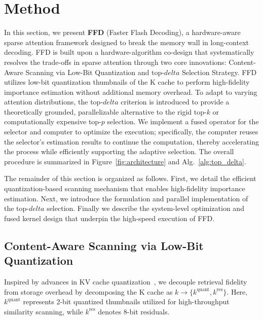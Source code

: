 \documentclass[]{mosi}
\def\bm#1{#1}%
\def\delta{delta}%
\theoremstyle{plain}
\theoremstyle{definition}
\theoremstyle{remark}
\begin{document}
\section{Method}
\label{sec:method}





In this section, we present \textbf{FFD} (Faster Flash Decoding), a hardware-aware sparse attention framework designed to break the memory wall in long-context decoding. FFD is built upon a hardware-algorithm co-design that systematically resolves the trade-offs in sparse attention through two core innovations: Content-Aware Scanning via Low-Bit Quantization and top-$\bm\delta$ Selection Strategy. FFD utilizes low-bit quantization thumbnails of the K cache to perform high-fidelity importance estimation without additional memory overhead. To adapt to varying attention distributions, the top-$\delta$ criterion is introduced to provide a theoretically grounded, parallelizable alternative to the rigid top-$k$ or computationally expensive top-$p$ selection. We implement a fused operator for the selector and computer to optimize the execution; specifically, the computer reuses the selector's estimation results to continue the computation, thereby accelerating the process while efficiently supporting the adaptive selection. The overall procedure is summarized in Figure~\ref{fig:architecture} and Alg.~\ref{alg:top_delta}.

The remainder of this section is organized as follows. First, we detail the efficient quantization-based scanning mechanism that enables high-fidelity importance estimation. Next, we introduce the formulation and parallel implementation of the top-$\delta$ selection. Finally we describe the system-level optimization and fused kernel design that underpin the high-speed execution of FFD.


\subsection{Content-Aware Scanning via Low-Bit Quantization}


Inspired by advances in KV cache quantization~\citep{liu2024kivi, hooper2024kvquant, yang2024no}, we decouple retrieval fidelity from storage overhead by decomposing the K cache as $\bm{k} \to \{\bm{k}^\text{quant}, \bm{k}^{\text{res}}\}$. Here, $\bm{k}^\text{quant}$ represents 2-bit quantized thumbnails utilized for high-throughput similarity scanning, while $\bm{k}^{\text{res}}$ denotes 8-bit residuals. 
\end{document}
